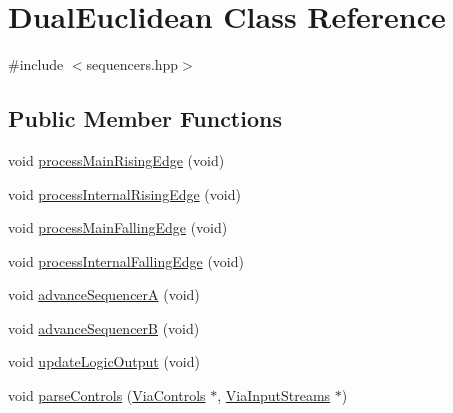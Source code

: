 \hypertarget{class_dual_euclidean}{}\section{Dual\+Euclidean Class Reference}
\label{class_dual_euclidean}


{\ttfamily \#include $<$sequencers.\+hpp$>$}

\subsection*{Public Member Functions}
\begin{DoxyCompactItemize}
\item 
void \mbox{\hyperlink{class_dual_euclidean_aaf05390e980a6a06a3bd5a999a3bfc2a}{process\+Main\+Rising\+Edge}} (void)
\item 
void \mbox{\hyperlink{class_dual_euclidean_a5f7f169fc8880eeb0ab56b8124c999e2}{process\+Internal\+Rising\+Edge}} (void)
\item 
void \mbox{\hyperlink{class_dual_euclidean_a025b9c5c5194fafabba03ea4a6b573d5}{process\+Main\+Falling\+Edge}} (void)
\item 
void \mbox{\hyperlink{class_dual_euclidean_afe6a9969ba4d40c748f2b341658f3630}{process\+Internal\+Falling\+Edge}} (void)
\item 
void \mbox{\hyperlink{class_dual_euclidean_adfa104faaaa81723ec6e3ce1f3f70d92}{advance\+SequencerA}} (void)
\item 
void \mbox{\hyperlink{class_dual_euclidean_a84bd2974dc771fde961db2e81797916f}{advance\+SequencerB}} (void)
\item 
void \mbox{\hyperlink{class_dual_euclidean_afed6b5eb3ac657c75b1d158ee53d1d84}{update\+Logic\+Output}} (void)
\item 
void \mbox{\hyperlink{class_dual_euclidean_ab18b3a9c1a51e7f47d6fc3c6fd26ef4a}{parse\+Controls}} (\mbox{\hyperlink{class_via_controls}{Via\+Controls}} $\ast$, \mbox{\hyperlink{class_via_input_streams}{Via\+Input\+Streams}} $\ast$)
\end{DoxyCompactItemize}
